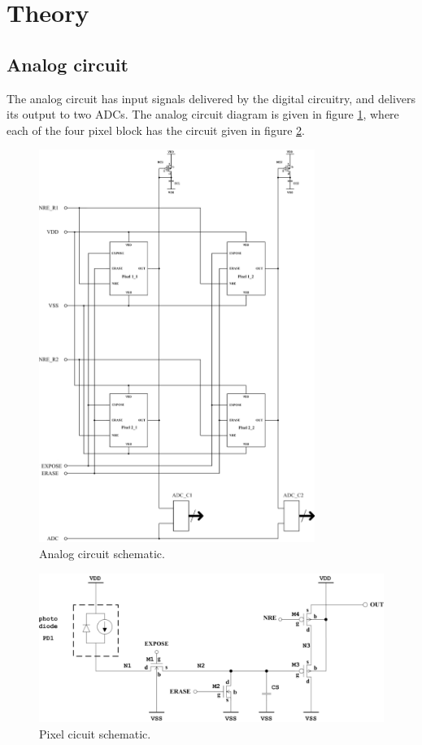 \section{Theory}

\subsection{Analog circuit}
\label{sec:analogCircuit}
The analog circuit has input signals delivered by the digital circuitry, and delivers its output to two ADCs. The analog circuit diagram is given in figure \ref{fig:analogCircuit}, where each of the four pixel block has the circuit given in figure \ref{fig:pixelCircuit}.

\begin{figure}
    \centering
    \includegraphics[width=0.8\textwidth]{graphs/analogCircuit.png}
    \caption{Analog circuit schematic.}
    \label{fig:analogCircuit}
\end{figure}

\begin{figure}
    \centering
    \includegraphics[width=\textwidth]{graphs/pixelCircuit.png}
    \caption{Pixel cicuit schematic.}
    \label{fig:pixelCircuit}
\end{figure}

